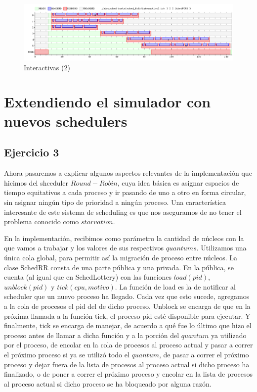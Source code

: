 \documentclass[11pt, a4paper, twoside]{article}
\begin{document}
\begin{figure}[H]
  \includegraphics [width=\textwidth]{../graficos/sched_fcfs/interactivo2_3.png}
  \caption{Interactivas (2)}
\end{figure}

\clearpage





\section{Extendiendo el simulador con nuevos schedulers}
\setcounter{subsection}{2}

\subsection{Ejercicio 3}
Ahora pasaremos a explicar algunos aspectos relevantes de la implementación que hicimos del shceduler
$Round-Robin$, cuya idea básica es asignar espacios de tiempo equitativos a cada proceso y ir pasando
de uno a otro en forma circular, sin asignar ningún tipo de prioridad a ningún proceso. Una
característica interesante de este sistema de scheduling es que nos aseguramos de no tener el problema
conocido como $starvation$. 

En la implementación, recibimos como parámetro la cantidad de núcleos con la que vamos a trabajar
y los valores de sus respectivos $quantums$. Utilizamos una única cola global, para permitir así la
migración de proceso entre núcleos. La clase SchedRR consta de una parte pública y una privada. En 
la pública, se cuenta (al igual que en SchedLottery) con las funciones $load(pid)$, $unblock(pid)$ 
y $tick(cpu, motivo)$. La función de load es la de notificar al scheduler que un nuevo proceso ha llegado.
Cada vez que esto sucede, agregamos a la cola de procesos el pid del de dicho proceso. Unblock se encarga 
de que en la próxima llamada a la función tick, el proceso pid esté disponible para ejecutar. Y 
finalmente, tick se encarga de manejar, de acuerdo a qué fue lo último que hizo el proceso antes de llamar
a dicha función y a la porción del $quantum$ ya utilizado por el proceso, de encolar en la cola de procesos
al proceso actual y pasar a correr el próximo proceso si ya se utilizó todo el $quantum$, de pasar a correr 
el próximo proceso y dejar fuera de la lista de procesos al proceso actual si dicho proceso ha finalizado, o de
poner a correr el próximo proceso y encolar en la lista de procesos al proceso actual si dicho proceso se ha
bloqueado por alguna razón. 
\end{document}
